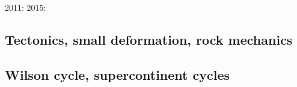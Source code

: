 2011: \cite{cube11}
2015: \cite{gehm15}

\subsection*{Tectonics, small deformation, rock mechanics}

\cite{ilma93}
\cite{hept96}
\cite{lega12}

\subsection*{Wilson cycle, supercontinent cycles}

\cite{trry95}
\cite{zhzl07}
\cite{zhzm09}
\cite{begb19}




